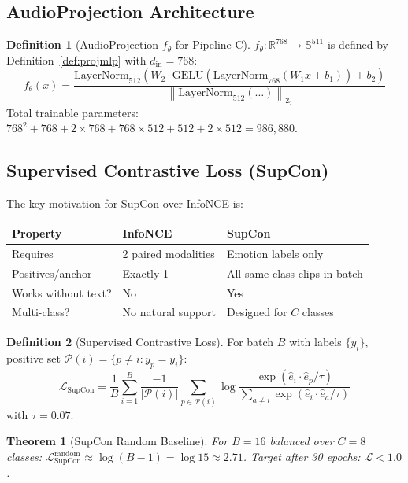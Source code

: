 \documentclass[12pt,a4paper]{article}
\theoremstyle{definition}
\newtheorem{definition}{Definition}[section]
\theoremstyle{plain}
\newtheorem{theorem}{Theorem}[section]
\theoremstyle{remark}
\newcommand{\R}{\mathbb{R}}
\newcommand{\Sph}{\mathbb{S}}
\newcommand{\Norm}[1]{\left\|#1\right\|_2}
\newcommand{\LN}{\mathrm{LayerNorm}}
\newcommand{\GELU}{\mathrm{GELU}}
\begin{document}
\subsection{AudioProjection Architecture}

\begin{definition}[AudioProjection $f_\theta$ for Pipeline C]
$f_\theta : \R^{768} \to \Sph^{511}$ is defined by Definition~\ref{def:projmlp} with $d_{\text{in}} = 768$:
\[
  f_\theta(x) = \frac{\LN_{512}(W_2 \cdot \GELU(\LN_{768}(W_1 x + b_1)) + b_2)}
  {\Norm{\LN_{512}(\ldots)}_2}
\]
Total trainable parameters: $768^2 + 768 + 2 \times 768 + 768 \times 512 + 512 + 2 \times 512 = 986{,}880$.
\end{definition}

\subsection{Supervised Contrastive Loss (SupCon)}

The key motivation for SupCon over InfoNCE is:

\begin{center}
\renewcommand{\arraystretch}{1.15}
\begin{tabular}{lll}
\toprule
\textbf{Property} & \textbf{InfoNCE} & \textbf{SupCon} \\
\midrule
Requires & 2 paired modalities & Emotion labels only \\
Positives/anchor & Exactly 1 & All same-class clips in batch \\
Works without text? & No & Yes \\
Multi-class? & No natural support & Designed for $C$ classes \\
\bottomrule
\end{tabular}
\end{center}

\begin{definition}[Supervised Contrastive Loss]
For batch $B$ with labels $\{y_i\}$, positive set $\mathcal{P}(i) = \{p \ne i : y_p = y_i\}$:
\[
  \boxed{\mathcal{L}_{\text{SupCon}} = \frac{1}{B}\sum_{i=1}^B \frac{-1}{|\mathcal{P}(i)|}
  \sum_{p \in \mathcal{P}(i)} \log\frac{\exp(\hat{e}_i \cdot \hat{e}_p / \tau)}{\sum_{a \ne i} \exp(\hat{e}_i \cdot \hat{e}_a / \tau)}}
\]
with $\tau = 0.07$.
\end{definition}

\begin{theorem}[SupCon Random Baseline]
For $B=16$ balanced over $C=8$ classes: $\mathcal{L}_{\text{SupCon}}^{\text{random}} \approx \log(B-1) = \log 15 \approx 2.71$. Target after 30 epochs: $\mathcal{L} < 1.0$.
\end{theorem}
\end{document}
